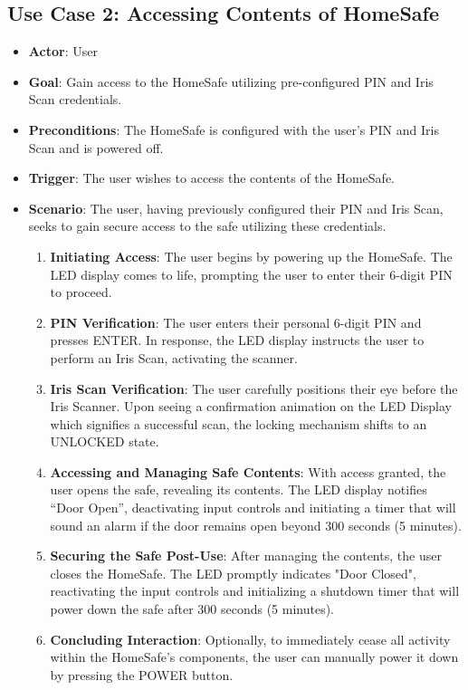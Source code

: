 \documentclass{article}
\begin{document}
\subsection{Use Case 2: Accessing Contents of HomeSafe}
\begin{itemize}
    \item \textbf{Actor}: User
    \item \textbf{Goal}: Gain access to the HomeSafe utilizing pre-configured PIN and Iris Scan credentials.
    \item \textbf{Preconditions}:  The HomeSafe is configured with the user’s PIN and Iris Scan and is powered off.
    \item \textbf{Trigger}: The user wishes to access the contents of the HomeSafe.
    \item \textbf{Scenario}: The user, having previously configured their PIN and Iris Scan, seeks to gain secure access to the safe utilizing these credentials.
    \begin{enumerate}
    \item \textbf{Initiating Access}: The user begins by powering up the HomeSafe. The LED display comes to life, prompting the user to enter their 6-digit PIN to proceed.
    \item \textbf{PIN Verification}: The user enters their personal 6-digit PIN and presses ENTER. In response, the LED display instructs the user to perform an Iris Scan, activating the scanner.
    \item \textbf{Iris Scan Verification}: The user carefully positions their eye before the Iris Scanner. Upon seeing a confirmation animation on the LED Display which signifies a successful scan, the locking mechanism shifts to an UNLOCKED state.
    \item \textbf{Accessing and Managing Safe Contents}: With access granted, the user opens the safe, revealing its contents. The LED display notifies “Door Open”, deactivating input controls and initiating a timer that will sound an alarm if the door remains open beyond 300 seconds (5 minutes).
    \item \textbf{Securing the Safe Post-Use}: After managing the contents, the user closes the HomeSafe. The LED promptly indicates "Door Closed", reactivating the input controls and initializing a shutdown timer that will power down the safe after 300 seconds (5 minutes).
    \item \textbf{Concluding Interaction}: Optionally, to immediately cease all activity within the HomeSafe’s components, the user can manually power it down by pressing the POWER button.
    \end{enumerate}
\end{itemize}
\end{document}
